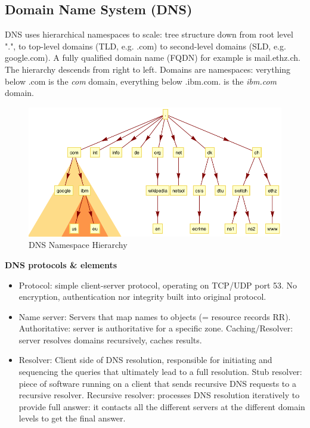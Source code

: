 \documentclass[11pt,oneside,a4paper]{article}
\begin{document}
\subsection{Domain Name System (DNS)}

DNS uses hierarchical namespaces to scale: tree structure down from root level ".", to top-level domains (TLD, e.g. .com) to second-level domains (SLD, e.g. google.com). A fully qualified domain name (FQDN) for example is mail.ethz.ch. The hierarchy descends from right to left. Domains are namespaces: verything below .com is the \textit{com} domain, everything below .ibm.com. is the \textit{ibm.com} domain.

\begin{figure}[hb]
	\centering
	\includegraphics[width=0.6\linewidth]{figures/dns_namespace_hierarchy}
	\caption{DNS Namespace Hierarchy}
	\label{fig:dnsnamespacehierarchy}
\end{figure}

\textbf{DNS protocols \& elements}

\vspace{-\topsep}
\begin{itemize}
	\setlength{\itemsep}{0pt}
	\setlength{\parskip}{0pt}
	\item Protocol: simple client-server protocol, operating on TCP/UDP port 53. No encryption, authentication nor integrity built into original protocol.
	\item Name server: Servers that map names to objects (= resource records RR). Authoritative: server is authoritative for a specific zone. Caching/Resolver: server resolves domains recursively, caches	results.
	\item Resolver: Client side of DNS resolution, responsible for initiating and sequencing the queries that ultimately lead to a full resolution. Stub resolver: piece of software running on a client that sends recursive DNS requests to a recursive resolver. Recursive resolver: processes DNS resolution iteratively to	provide full answer: it contacts all the different servers at the different domain levels to get the final answer.
\end{itemize}
\vspace{-\topsep}
\end{document}
